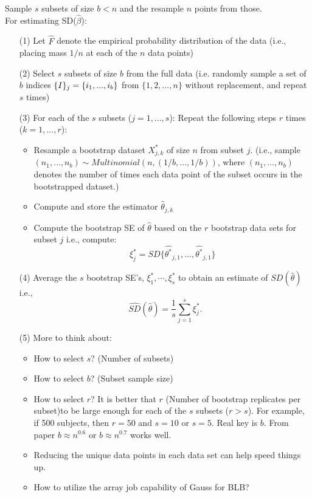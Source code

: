 \documentclass[11pt]{article}
\begin{document}
\begin{itemize}
  Sample $s$ subsets of size $b<n$ and the resample $n$ points from those.\\
  For estimating SD($\widehat{\beta}$):
   \begin{itemize}
      \item [(1)] Let $\widehat{F}$ denote the empirical probability distribution of the data (i.e., placing mass $1/n$ at each of the $n$ data points)
      \item [(2)]Select $s$ subsets of size $b$ from the full data (i.e. randomly sample a set of $b$ indices $\mathcal\{I\}_j=\{i_1,...,i_b\}$ from $\{1,2,...,n\}$ without replacement, and repeat $s$ times)
      \item [(3)] For each of the $s$ subsets ($j=1,...,s$):
       Repeat the following steps $r$ times ($k=1,...,r$):
            \begin{itemize}
                \item Resample a bootstrap dataset $X_{j,k}^*$ of size $n$ from subset $j$. (i.e., sample $(n_1,…,n_b)\sim Multinomial(n,(1/b,…,1/b))$, where $(n_1,…,n_b)$ denotes the number of times each data point of the subset occurs in the bootstrapped dataset.)
                \item Compute and store the estimator $\widehat{\theta}_{j,k}$
                \item Compute the bootstrap SE of $\widehat{\theta}$ based on the $r$ bootstrap data sets for subset $j$ i.e., compute: $$\xi_j^*=SD\{\widehat{\theta^*}_{j,1},...,\widehat{\theta^*}_{j,1}\}$$
            \end{itemize}
       \item [(4)] Average the $s$ bootstrap SE's, $\xi_1^*,\cdots,\xi_s^*$ to obtain an estimate of $SD(\hat{\theta})$ i.e.,
           $$\widehat{SD}(\hat{\theta})=\frac{1}{s}\sum \limits_{j=1}^s \xi_j^*.$$

       \item [(5)]More to think about:
          \begin{itemize}
            \item How to select $s$? (Number of subsets)
            \item How to select $b$? (Subset sample size)
            \item How to select $r$? It is better that $r$ (Number of bootstrap replicates per subset)to be large enough for each of the $s$ subsets ($r>s$). For example, if 500 subjects, then $r=50$ and $s=10$ or $s=5$.
                 Real key is $b$. From paper $b\approx n^{0.6}$ or $b\approx n^{0.7}$ works well.
            \item Reducing the unique data points in each data set can help speed things up.
            \item How to utilize the array job capability of Gauss for BLB?
         \end{itemize}
         
    \end{itemize}
    
\end{itemize}
\end{document}
